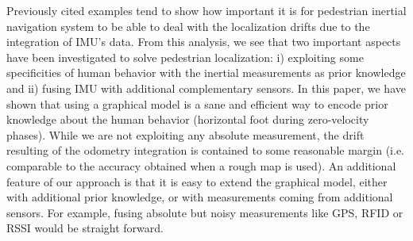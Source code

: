 
Previously cited examples tend to show how important it is for pedestrian inertial navigation system to be able to deal with the localization drifts due to the integration of IMU's data. 
From this analysis, we see that two important aspects have been investigated to solve pedestrian localization: i) exploiting some specificities of human behavior with the inertial measurements as prior knowledge and ii) fusing IMU with additional complementary sensors.
In this paper, we have shown that using a graphical model is a sane and efficient way to encode prior knowledge about the human behavior (horizontal foot during zero-velocity phases).
While we are not exploiting any absolute measurement, the drift resulting of the odometry integration is contained to some reasonable margin (i.e. comparable to the accuracy obtained when a rough map is used).
An additional feature of our approach is that it is easy to extend the graphical model, either with additional prior knowledge, or with measurements coming from additional sensors.
For example, fusing absolute but noisy measurements like GPS, RFID or RSSI would be straight forward.